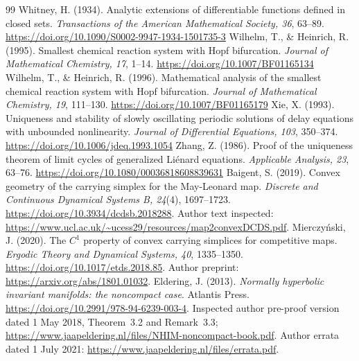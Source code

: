 \begin{thebibliography}{99}
 Whitney, H. (1934). Analytic extensions of differentiable functions defined in closed sets. \emph{Transactions of the American Mathematical Society, 36}, 63--89. \url{https://doi.org/10.1090/S0002-9947-1934-1501735-3}
 Wilhelm, T., \& Heinrich, R. (1995). Smallest chemical reaction system with Hopf bifurcation. \emph{Journal of Mathematical Chemistry, 17}, 1--14. \url{https://doi.org/10.1007/BF01165134}
 Wilhelm, T., \& Heinrich, R. (1996). Mathematical analysis of the smallest chemical reaction system with Hopf bifurcation. \emph{Journal of Mathematical Chemistry, 19}, 111--130. \url{https://doi.org/10.1007/BF01165179}
 Xie, X. (1993). Uniqueness and stability of slowly oscillating periodic solutions of delay equations with unbounded nonlinearity. \emph{Journal of Differential Equations, 103}, 350--374. \url{https://doi.org/10.1006/jdeq.1993.1054}
 Zhang, Z. (1986). Proof of the uniqueness theorem of limit cycles of generalized Li\'enard equations. \emph{Applicable Analysis, 23}, 63--76. \url{https://doi.org/10.1080/00036818608839631}
 Baigent, S. (2019). Convex geometry of the carrying simplex for the May-Leonard map. \emph{Discrete and Continuous Dynamical Systems B, 24}(4), 1697--1723. \url{https://doi.org/10.3934/dcdsb.2018288}. Author text inspected: \url{https://www.ucl.ac.uk/~ucess29/resources/map2convexDCDS.pdf}.
 Mierczy\'nski, J. (2020). The $C^1$ property of convex carrying simplices for competitive maps. \emph{Ergodic Theory and Dynamical Systems, 40}, 1335--1350. \url{https://doi.org/10.1017/etds.2018.85}. Author preprint: \url{https://arxiv.org/abs/1801.01032}.
 Eldering, J. (2013). \emph{Normally hyperbolic invariant manifolds: the noncompact case}. Atlantis Press. \url{https://doi.org/10.2991/978-94-6239-003-4}. Inspected author pre-proof version dated 1 May 2018, Theorem~3.2 and Remark~3.3; \url{https://www.jaapeldering.nl/files/NHIM-noncompact-book.pdf}. Author errata dated 1 July 2021: \url{https://www.jaapeldering.nl/files/errata.pdf}.
\end{thebibliography}
